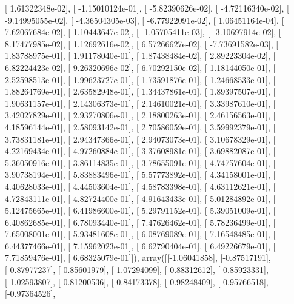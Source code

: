 \documentclass{article}
\begin{document}
       [  1.61322348e-02],
       [ -1.15010124e-01],
       [ -5.82390626e-02],
       [ -4.72116340e-02],
       [ -9.14995055e-02],
       [ -4.36504305e-03],
       [ -6.77922091e-02],
       [  1.06451164e-04],
       [  7.62067684e-02],
       [  1.10443647e-02],
       [ -1.05705411e-03],
       [ -3.10697914e-02],
       [  8.17477985e-02],
       [  1.12692616e-02],
       [  6.57266627e-02],
       [ -7.73691582e-03],
       [  1.83788975e-01],
       [  1.91178040e-01],
       [  1.87438484e-02],
       [  2.89223304e-02],
       [  6.82224423e-02],
       [  9.26320696e-02],
       [  6.70292150e-02],
       [  1.18144050e-01],
       [  2.52598513e-01],
       [  1.99623727e-01],
       [  1.73591876e-01],
       [  1.24668533e-01],
       [  1.88264769e-01],
       [  2.63582948e-01],
       [  1.34437861e-01],
       [  1.89397507e-01],
       [  1.90631157e-01],
       [  2.14306373e-01],
       [  2.14610021e-01],
       [  3.33987610e-01],
       [  3.42027829e-01],
       [  2.93270806e-01],
       [  2.18800263e-01],
       [  2.46156563e-01],
       [  4.18596144e-01],
       [  2.58093142e-01],
       [  2.70586059e-01],
       [  3.59992379e-01],
       [  3.73831181e-01],
       [  2.94347366e-01],
       [  2.94073073e-01],
       [  3.10678329e-01],
       [  4.22169434e-01],
       [  4.97260884e-01],
       [  3.37608981e-01],
       [  3.69882087e-01],
       [  5.36050916e-01],
       [  3.86114835e-01],
       [  3.78655091e-01],
       [  4.74757604e-01],
       [  3.90738194e-01],
       [  5.83883496e-01],
       [  5.57773892e-01],
       [  4.34158001e-01],
       [  4.40628033e-01],
       [  4.44503604e-01],
       [  4.58783398e-01],
       [  4.63112621e-01],
       [  4.72843111e-01],
       [  4.82724400e-01],
       [  4.91643433e-01],
       [  5.01284892e-01],
       [  5.12475665e-01],
       [  6.41986600e-01],
       [  5.29791152e-01],
       [  5.39051009e-01],
       [  6.40862685e-01],
       [  6.78093440e-01],
       [  7.47626462e-01],
       [  5.78236499e-01],
       [  7.65008001e-01],
       [  5.93481608e-01],
       [  6.08769089e-01],
       [  7.16548485e-01],
       [  6.44377466e-01],
       [  7.15962023e-01],
       [  6.62790404e-01],
       [  6.49226679e-01],
       [  7.71859476e-01],
       [  6.68325079e-01]]), array([[-1.06041858],
       [-0.87517191],
       [-0.87977237],
       [-0.85601979],
       [-1.07294099],
       [-0.88312612],
       [-0.85923331],
       [-1.02593807],
       [-0.81200536],
       [-0.84173378],
       [-0.98248409],
       [-0.95766518],
       [-0.97364526],
\end{document}
